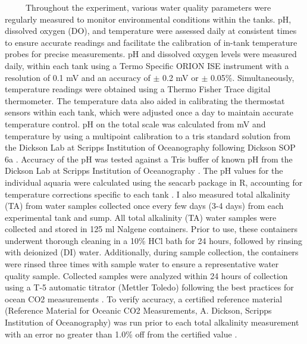 \documentclass[
]{article}
\begin{document}
~~~~~Throughout the experiment, various water quality parameters were
regularly measured to monitor environmental conditions within the tanks.
pH, dissolved oxygen (DO), and temperature were assessed daily at
consistent times to ensure accurate readings and facilitate the
calibration of in-tank temperature probes for precise measurements. pH
and dissolved oxygen levels were measured daily, within each tank using
a Termo Specific ORION ISE instrument with a resolution of 0.1 mV and an
accuracy of \(\pm\) 0.2 mV or \(\pm\) 0.05\%. Simultaneously,
temperature readings were obtained using a Thermo Fisher Trace digital
thermometer. The temperature data also aided in calibrating the
thermostat sensors within each tank, which were adjusted once a day to
maintain accurate temperature control. pH on the total scale was
calculated from mV and temperature by using a multipoint calibration to
a tris standard solution from the Dickson Lab at Scripps Institution of
Oceanography following Dickson SOP 6a \citep{dickson2007guide}. Accuracy
of the pH was tested against a Tris buffer of known pH from the Dickson
Lab at Scripps Institution of Oceanography \citep{dickson2007guide}. The
pH values for the individual aquaria were calculated using the seacarb
package in R, accounting for temperature corrections specific to each
tank \citep{gattuso2015package}. I also measured total alkalinity (TA)
from water samples collected once every few days (3-4 days) from each
experimental tank and sump. All total alkalinity (TA) water samples were
collected and stored in 125 ml Nalgene containers. Prior to use, these
containers underwent thorough cleaning in a 10\% HCl bath for 24 hours,
followed by rinsing with deionized (DI) water. Additionally, during
sample collection, the containers were rinsed three times with sample
water to ensure a representative water quality sample. Collected samples
were analyzed within 24 hours of collection using a T-5 automatic
titrator (Mettler Toledo) following the best practices for ocean CO2
measurements \citep{dickson2007guide}. To verify accuracy, a certified
reference material (Reference Material for Oceanic CO2 Measurements, A.
Dickson, Scripps Institution of Oceanography) was run prior to each
total alkalinity measurement with an error no greater than 1.0\% off
from the certified value \citep{dickson2007guide}.
\end{document}
